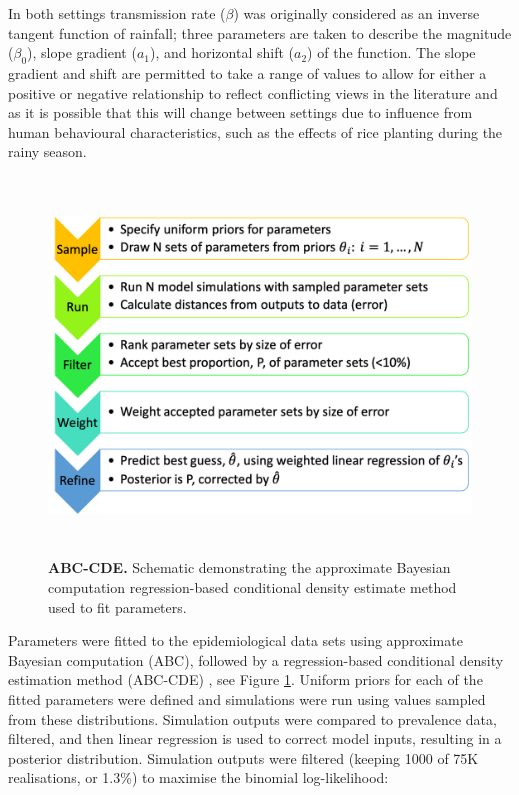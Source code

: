 In both settings transmission rate ($\beta$) was originally considered as an inverse tangent function of rainfall; three parameters are taken to describe the magnitude ($\beta_0$), slope gradient ($a_1$), and horizontal shift ($a_2$) of the function. The slope gradient and shift are permitted to take a range of values to allow for either a positive or negative relationship to reflect conflicting views in the literature and as it is possible that this will change between settings due to influence from human behavioural characteristics, such as the effects of rice planting during the rainy season. 

\begin{figure}[!h]
\begin{center}
\includegraphics[height=10cm]{Project/Figures/STH/ABCdiag.png}
\caption{{\bf ABC-CDE.}
Schematic demonstrating the approximate Bayesian computation regression-based conditional density estimate method used to fit parameters.}
\label{fig:ABCdiag}
\end{center}
\end{figure} 

Parameters were fitted to the epidemiological data sets using approximate Bayesian computation (ABC), followed by a regression-based conditional density estimation method (ABC-CDE) \cite{Beaumont}, see Figure \ref{fig:ABCdiag}. Uniform priors for each of the fitted parameters were defined and simulations were run using values sampled from these distributions. Simulation outputs were compared to prevalence data, filtered, and then linear regression is used to correct model inputs, resulting in a posterior distribution. Simulation outputs were filtered (keeping 1000 of 75K realisations, or 1.3\%) to maximise the binomial log-likelihood: 

